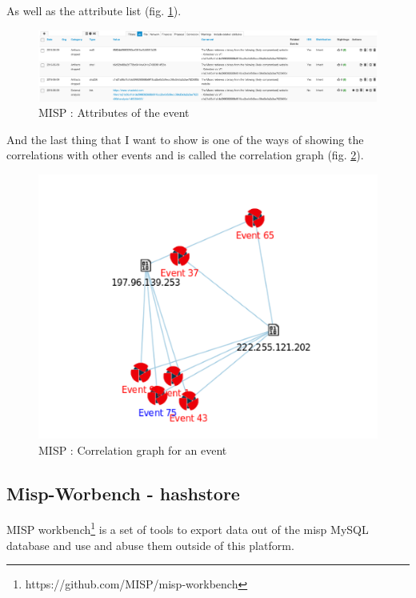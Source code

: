 \documentclass{eplmastersthesis}
\begin{document}
As well as the attribute list (fig. \ref{webattributes}).
\begin{figure}[!h]
	\begin{center}
		\includegraphics[scale=0.35]{res/webAttributes}
		\caption{MISP : Attributes of the event}
		\label{webattributes}
	\end{center}
\end{figure}

And the last thing that I want to show is one of the ways of showing the correlations with other events and is called the correlation graph (fig. \ref{webcorrelation}).
\begin{figure}[!h]
	\begin{center}
		\includegraphics[scale=0.35]{res/webCorrelationGraph}
		\caption{MISP : Correlation graph for an event}
		\label{webcorrelation}
	\end{center}
\end{figure}

\subsection{Misp-Worbench - hashstore}

MISP workbench\footnote{https://github.com/MISP/misp-workbench} is a set of tools to export data out of the \gls{misp} MySQL database and use and abuse them outside of this platform.\\
\end{document}
